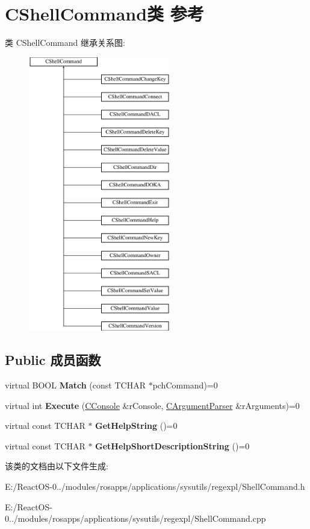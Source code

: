 \hypertarget{class_c_shell_command}{}\section{C\+Shell\+Command类 参考}
\label{class_c_shell_command}
类 C\+Shell\+Command 继承关系图\+:\begin{figure}[H]
\begin{center}
\leavevmode
\includegraphics[height=12.000000cm]{class_c_shell_command}
\end{center}
\end{figure}
\subsection*{Public 成员函数}
\begin{DoxyCompactItemize}
\item 
\mbox{\label{class_c_shell_command_a7cfbb3ad86232ead069bc7abff4cc80e}} 
virtual B\+O\+OL {\bfseries Match} (const T\+C\+H\+AR $\ast$pch\+Command)=0
\item 
\mbox{\label{class_c_shell_command_aa3b865f4c5d9ae70c5a17c5ba6f10f23}} 
virtual int {\bfseries Execute} (\hyperlink{class_c_console}{C\+Console} \&r\+Console, \hyperlink{class_c_argument_parser}{C\+Argument\+Parser} \&r\+Arguments)=0
\item 
\mbox{\label{class_c_shell_command_af412a673a1428ea6656c47ca5ee463cc}} 
virtual const T\+C\+H\+AR $\ast$ {\bfseries Get\+Help\+String} ()=0
\item 
\mbox{\label{class_c_shell_command_af00a1913abb416300cfc8b49e0b99975}} 
virtual const T\+C\+H\+AR $\ast$ {\bfseries Get\+Help\+Short\+Description\+String} ()=0
\end{DoxyCompactItemize}


该类的文档由以下文件生成\+:\begin{DoxyCompactItemize}
\item 
E\+:/\+React\+O\+S-\/0../modules/rosapps/applications/sysutils/regexpl/Shell\+Command.\+h\item 
E\+:/\+React\+O\+S-\/0../modules/rosapps/applications/sysutils/regexpl/Shell\+Command.\+cpp\end{DoxyCompactItemize}
